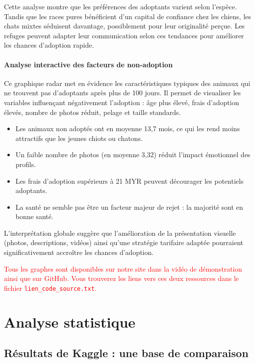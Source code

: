 \documentclass[a4paper,12pt]{article}
\begin{document}
Cette analyse montre que les préférences des adoptants varient selon l’espèce. Tandis que les races pures bénéficient d’un capital de confiance chez les chiens, les chats mixtes séduisent davantage, possiblement pour leur originalité perçue. Les refuges peuvent adapter leur communication selon ces tendances pour améliorer les chances d’adoption rapide.

\paragraph{Analyse interactive des facteurs de non-adoption}

Ce graphique radar met en évidence les caractéristiques typiques des animaux qui ne trouvent pas d’adoptants après plus de 100 jours. Il permet de visualiser les variables influençant négativement l’adoption : âge plus élevé, frais d’adoption élevés, nombre de photos réduit, pelage et taille standards.

\begin{itemize}
    \item Les animaux non adoptés ont en moyenne 13,7 mois, ce qui les rend moins attractifs que les jeunes chiots ou chatons.
    \item Un faible nombre de photos (en moyenne 3,32) réduit l’impact émotionnel des profils.
    \item Les frais d’adoption supérieurs à 21 MYR peuvent décourager les potentiels adoptants.
    \item La santé ne semble pas être un facteur majeur de rejet : la majorité sont en bonne santé.
\end{itemize}

L’interprétation globale suggère que l’amélioration de la présentation visuelle (photos, descriptions, vidéos) ainsi qu’une stratégie tarifaire adaptée pourraient significativement accroître les chances d’adoption.

\textcolor{red}{Tous les graphes sont disponibles sur notre site dans la vidéo de démonstration ainsi que sur GitHub. Vous trouverez les liens vers ces deux ressources dans le fichier \texttt{lien\_code\_source.txt}.}

\section{Analyse statistique}


\subsection{Résultats de Kaggle : une base de comparaison}
\end{document}
